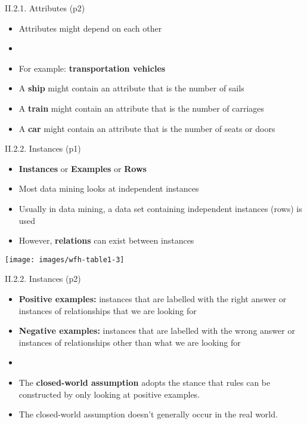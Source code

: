 \documentclass[handout]{beamer}
\newcommand{\strong}[1]{\textbf{\color{teal} #1}}
\newcommand{\stronger}[1]{\textbf{\color{purple} #1}}
\begin{document}
\begin{frame}{II.2.1. Attributes (p2)}
\begin{itemize}
\item Attributes might depend on each other
\item[]
\item[] For example: \stronger{transportation vehicles}
\item A \strong{ship} might contain an attribute that is the number of sails
\item A \strong{train} might contain an attribute that is the number of carriages
\item A \strong{car} might contain an attribute that is the number of seats or doors
\end{itemize}
\end{frame}
\begin{frame}{II.2.2. Instances (p1)}
\begin{itemize}
\item \stronger{Instances} or \stronger{Examples} or \stronger{Rows}
\item Most data mining looks at independent instances
\item Usually in data mining, a data set containing independent instances (rows) is used\\
\item However, \strong{relations} can exist between instances
\end{itemize}
\begin{center}
\texttt{[image: images/wfh-table1-3]}
\cite[Table 1.3]{WFH3:2011}
\end{center}
\end{frame}
\begin{frame}{II.2.2. Instances (p2)}
\begin{itemize}
\item \strong{Positive examples:} instances that are labelled with the right answer or instances of relationships that we are looking for
\item \strong{Negative examples:} instances that are labelled with the wrong answer or instances of relationships other than what we are looking for
\item[]
\item The \strong{closed-world assumption} adopts the stance that rules can be constructed by only looking at positive examples.
\item The closed-world assumption doesn't generally occur in the real world.
\end{itemize}
\end{frame}
\end{document}
